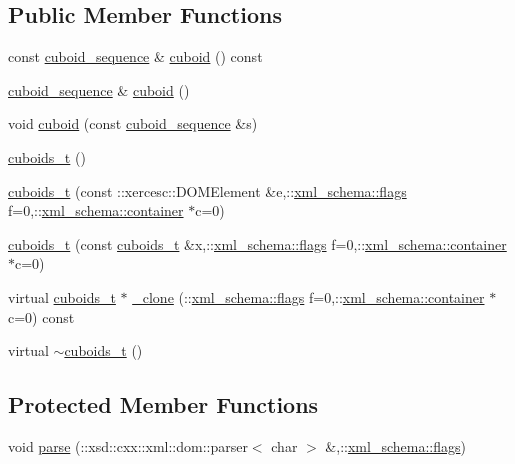 \subsection*{Public Member Functions}
\begin{DoxyCompactItemize}
\item 
const \hyperlink{classcuboids__t_ae3d3abd50bb0570dfe0d4d2d97485261}{cuboid\-\_\-sequence} \& \hyperlink{classcuboids__t_aeb1e3d9339c27438d0b05fa28836a164}{cuboid} () const 
\item 
\hyperlink{classcuboids__t_ae3d3abd50bb0570dfe0d4d2d97485261}{cuboid\-\_\-sequence} \& \hyperlink{classcuboids__t_a91312ccc2a7af492294fa940c5b92302}{cuboid} ()
\item 
void \hyperlink{classcuboids__t_ab05aa257894ab2b0fddf4b40fab766e3}{cuboid} (const \hyperlink{classcuboids__t_ae3d3abd50bb0570dfe0d4d2d97485261}{cuboid\-\_\-sequence} \&s)
\item 
\hyperlink{classcuboids__t_a56be77bec0772d60210b3f79ecd7517a}{cuboids\-\_\-t} ()
\item 
\hyperlink{classcuboids__t_ab8bb7bb7d61bcbb5a7c424c1a352b97a}{cuboids\-\_\-t} (const \-::xercesc\-::\-D\-O\-M\-Element \&e,\-::\hyperlink{namespacexml__schema_a0612287d030cb2732d31a45b258fdc87}{xml\-\_\-schema\-::flags} f=0,\-::\hyperlink{namespacexml__schema_ada9aa30dc722e93ee2ed7243085402a5}{xml\-\_\-schema\-::container} $\ast$c=0)
\item 
\hyperlink{classcuboids__t_a47833a6b8a1a427de79a8efa8ba86dc0}{cuboids\-\_\-t} (const \hyperlink{classcuboids__t}{cuboids\-\_\-t} \&x,\-::\hyperlink{namespacexml__schema_a0612287d030cb2732d31a45b258fdc87}{xml\-\_\-schema\-::flags} f=0,\-::\hyperlink{namespacexml__schema_ada9aa30dc722e93ee2ed7243085402a5}{xml\-\_\-schema\-::container} $\ast$c=0)
\item 
virtual \hyperlink{classcuboids__t}{cuboids\-\_\-t} $\ast$ \hyperlink{classcuboids__t_a4dae998f9ea7ba9a2321d49d2f617f87}{\-\_\-clone} (\-::\hyperlink{namespacexml__schema_a0612287d030cb2732d31a45b258fdc87}{xml\-\_\-schema\-::flags} f=0,\-::\hyperlink{namespacexml__schema_ada9aa30dc722e93ee2ed7243085402a5}{xml\-\_\-schema\-::container} $\ast$c=0) const 
\item 
virtual \hyperlink{classcuboids__t_a8dcfc7aab5951518c3c28e7a0db699ee}{$\sim$cuboids\-\_\-t} ()
\end{DoxyCompactItemize}
\subsection*{Protected Member Functions}
\begin{DoxyCompactItemize}
\item 
void \hyperlink{classcuboids__t_a63261d4cd5babc19315baa9db3db4cbb}{parse} (\-::xsd\-::cxx\-::xml\-::dom\-::parser$<$ char $>$ \&,\-::\hyperlink{namespacexml__schema_a0612287d030cb2732d31a45b258fdc87}{xml\-\_\-schema\-::flags})
\end{DoxyCompactItemize}
